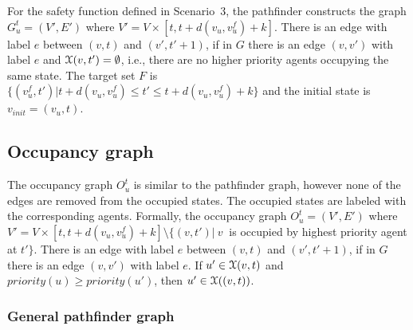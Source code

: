 \begin{eg}\label{eg:collavoid}
For the safety function defined in Scenario~3, the 
pathfinder constructs the graph $G^t_{u} = (V', E')$ where $V'=V\times[t,t+d(v_u,v_u^f)+k]$. There is an edge with label $e$ between $(v,t)$ and $(v',t' +1)$, if in $G$ there is an edge $(v,v')$ with label $e$ and $\mathcal{X}(v,t') = \emptyset$, i.e., there are no higher priority agents occupying the same state. 
The target set $F$ is $\{(v^f_{u} ,t') | t+ d(v_u,v_u^f) \leq t' \leq t + d(v_u,v_u^f) + k\}$ and the initial state is $v_{init} = (v_{u},t)$. %
\end{eg}

\subsection{Occupancy graph}
The occupancy graph $O^t_u$ is similar to the pathfinder graph, however none of the edges are removed from the occupied states. The occupied states are labeled with the corresponding agents. Formally, the occupancy graph $O^t_{u} = (V', E')$ where $V'=V\times[t,t+d(v_u,v_u^f)+k] \setminus \{(v,t')|~v~$ is occupied by highest priority agent at $ t'\}$. There is an edge with label $e$ between $(v,t)$ and $(v',t' +1)$, if in $G$ there is an edge $(v,v')$ with label $e$. If $u' \in \mathcal{X}(v,t)$ and $priority(u) \geq priority(u')$, then $u' \in \mathcal{X}((v,t))$.  

\subsubsection{General pathfinder graph}

